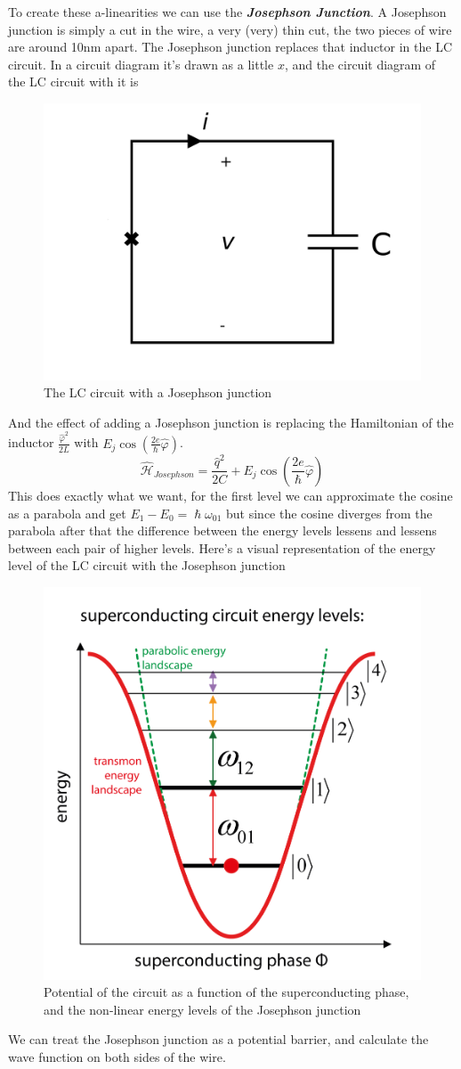 To create these a-linearities we can use the \textbf{\textit{Josephson Junction}}. A Josephson junction is simply a cut in the wire, a very (very) thin cut, the two pieces of wire are around 10nm apart. The Josephson junction replaces that inductor in the LC circuit. In a circuit diagram it's drawn as a little $x$, and the circuit diagram of the LC circuit with it is
\begin{figure}[H]
    \centering
    \includegraphics[width=0.43\columnwidth]{gfx/LC-circuit-josephson.png}
    \caption{The LC circuit with a Josephson junction} 
    \label{fig:LC-circuit-Josephson}
\end{figure}
And the effect of adding a Josephson junction is replacing the Hamiltonian of the inductor $\frac{\hat{\varphi}^2}{2L}$ with $E_j \cos (\frac{2e}{\hslash} \hat{\varphi})$.
\[
    \hat{\mathcal{H}}_{Josephson} = \frac{\hat{q}^2}{2C} + E_j \cos (\frac{2e}{\hslash} \hat{\varphi})
\]
This does exactly what we want, for the first level we can approximate the cosine as a parabola and get $E_1 - E_0 = \hslash \omega_{01}$ but since the cosine diverges from the parabola after that the difference between the energy levels lessens and lessens between each pair of higher levels. Here's a visual representation of the energy level of the LC circuit with the Josephson junction
\begin{figure}[H]
    \centering
    \includegraphics[width=0.7\columnwidth]{gfx/josephson-energy-levels.png}
    \caption{Potential of the circuit as a function of the superconducting phase, and the non-linear energy levels of the Josephson junction} 
    \label{fig:Josephson-energy-levels}
\end{figure}
We can treat the Josephson junction as a potential barrier, and calculate the wave function on both sides of the wire.

